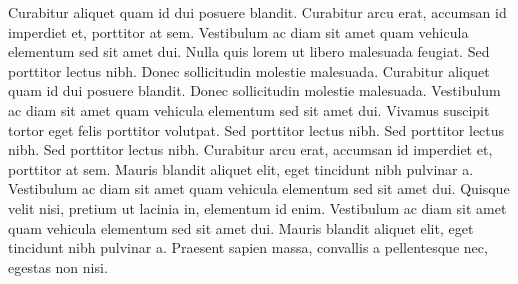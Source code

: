 \documentclass{article}
\begin{document}
Curabitur aliquet quam id dui posuere blandit. Curabitur arcu erat, accumsan id imperdiet et, porttitor at sem. Vestibulum ac diam sit amet quam vehicula elementum sed sit amet dui. Nulla quis lorem ut libero malesuada feugiat. Sed porttitor lectus nibh. Donec sollicitudin molestie malesuada. Curabitur aliquet quam id dui posuere blandit. Donec sollicitudin molestie malesuada. Vestibulum ac diam sit amet quam vehicula elementum sed sit amet dui. Vivamus suscipit tortor eget felis porttitor volutpat. Sed porttitor lectus nibh. Sed porttitor lectus nibh. Sed porttitor lectus nibh. Curabitur arcu erat, accumsan id imperdiet et, porttitor at sem. Mauris blandit aliquet elit, eget tincidunt nibh pulvinar a. Vestibulum ac diam sit amet quam vehicula elementum sed sit amet dui. Quisque velit nisi, pretium ut lacinia in, elementum id enim. Vestibulum ac diam sit amet quam vehicula elementum sed sit amet dui. Mauris blandit aliquet elit, eget tincidunt nibh pulvinar a. Praesent sapien massa, convallis a pellentesque nec, egestas non nisi.

\endnumbering
\end{document}
